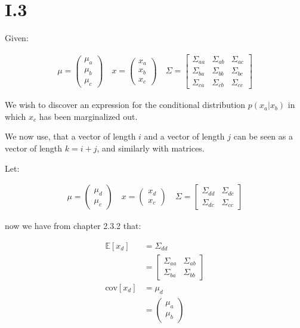 \FloatBarrier
\pagebreak
\section*{I.3}

Given:

\begin{align*}
	\mu = \begin{pmatrix}
		\mu_a \\
		\mu_b \\
		\mu_c
	\end{pmatrix} \quad
	x = \begin{pmatrix}
		x_a \\
		x_b \\
		x_c
	\end{pmatrix} \quad
	\Sigma = \begin{bmatrix}
		\Sigma_{aa} & \Sigma_{ab} & \Sigma_{ac} \\
		\Sigma_{ba} & \Sigma_{bb} & \Sigma_{bc} \\
		\Sigma_{ca} & \Sigma_{cb} & \Sigma_{cc}
	\end{bmatrix}
\end{align*}

We wish to discover an expression for the conditional distribution $p(x_a|x_b)$
in which $x_c$ has been marginalized out.

We now use, that a vector of length $i$ and a vector of length $j$
can be seen as a vector of length $k=i+j$, and similarly with matrices.

Let:

\begin{align*}
	\mu = \begin{pmatrix}
		\mu_d \\
		\mu_c
	\end{pmatrix} \quad
	x = \begin{pmatrix}
		x_d \\
		x_c
	\end{pmatrix} \quad
	\Sigma = \begin{bmatrix}
		\Sigma_{dd} & \Sigma_{dc} \\
		\Sigma_{dc} & \Sigma_{cc}
	\end{bmatrix}
\end{align*}

now we have from chapter 2.3.2 that:

\begin{align*}
	\mathbb{E}[x_d] &= \Sigma_{dd} \\
	&= \begin{bmatrix}
		\Sigma_{aa} & \Sigma_{ab} \\
		\Sigma_{ba} & \Sigma_{bb}
	   \end{bmatrix} \\
	\text{cov}[x_d] &= \mu_d \\
	&= \begin{pmatrix}
		\mu_a \\
		\mu_b
	   \end{pmatrix}
\end{align*}

